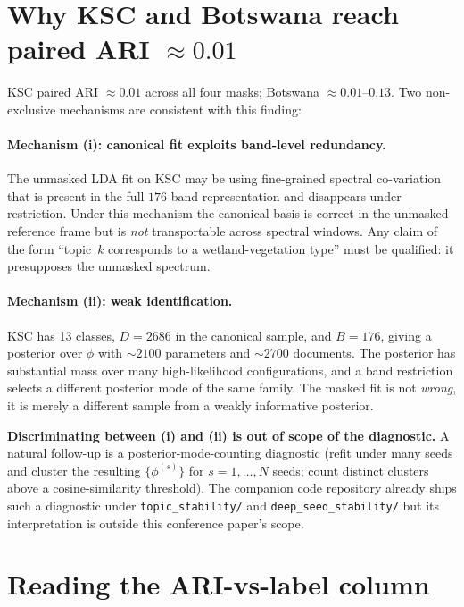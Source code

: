 \documentclass[11pt,a4paper]{article}
\begin{document}
\section{Why KSC and Botswana reach paired ARI \texorpdfstring{$\approx 0.01$}{~0.01}}

KSC paired ARI $\approx 0.01$ across all four masks; Botswana
$\approx 0.01$--$0.13$. Two non-exclusive mechanisms are consistent
with this finding:

\paragraph{Mechanism (i): canonical fit exploits band-level
redundancy.} The unmasked LDA fit on KSC may be using fine-grained
spectral co-variation that is present in the full $176$-band
representation and disappears under restriction. Under this
mechanism the canonical basis is correct in the unmasked reference
frame but is \emph{not} transportable across spectral windows. Any
claim of the form ``topic~$k$ corresponds to a wetland-vegetation
type'' must be qualified: it presupposes the unmasked spectrum.

\paragraph{Mechanism (ii): weak identification.} KSC has 13 classes,
$D = 2686$ in the canonical sample, and $B = 176$, giving a
posterior over $\phi$ with $\sim 2100$ parameters and $\sim 2700$
documents. The posterior has substantial mass over many
high-likelihood configurations, and a band restriction selects a
different posterior mode of the same family. The masked fit is not
\emph{wrong}, it is merely a different sample from a weakly
informative posterior.

\textbf{Discriminating between (i) and (ii) is out of scope of the
diagnostic.} A natural follow-up is a posterior-mode-counting
diagnostic (refit under many seeds and cluster the resulting
$\{\phi^{(s)}\}$ for $s = 1, \ldots, N$ seeds; count distinct
clusters above a cosine-similarity threshold). The companion code
repository already ships such a diagnostic under \texttt{topic\_stability/}
and \texttt{deep\_seed\_stability/} but its interpretation is outside
this conference paper's scope.

\section{Reading the ARI-vs-label column}
\end{document}
